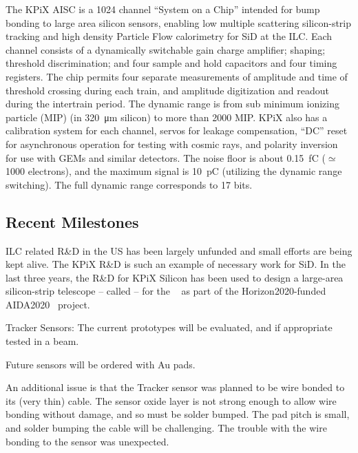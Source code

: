 The KPiX AISC is a 1024 channel ``System on a Chip'' intended for bump bonding 
to large area silicon sensors, enabling low multiple scattering silicon-strip 
tracking and high density Particle Flow calorimetry for SiD at the ILC. 
Each channel consists of a dynamically switchable gain charge amplifier; 
shaping; threshold discrimination; and four sample and hold 
capacitors and four timing registers. The chip permits four  separate measurements of 
amplitude and time of threshold crossing during each train, and amplitude 
digitization and readout during the intertrain period. The dynamic range is from 
sub minimum ionizing particle (MIP) (in \SI{320}{\micro\meter} silicon) to more 
than 2000 MIP. KPiX also has a calibration system for each channel, servos for 
leakage compensation, ``DC'' reset for asynchronous operation for testing with 
cosmic rays, and polarity inversion for use with GEMs and similar detectors. The 
noise floor is about \SI{0.15}{fC} ($\simeq$ 1000 electrons), and the maximum 
signal is \SI{10}{pC} (utilizing the dynamic range switching). The full dynamic 
range corresponds to 17 bits.


\subsection{Recent Milestones}
ILC related R\&D in the US has been largely unfunded and small efforts are being kept alive. The KPiX R\&D is such an example of necessary work for SiD.
In the last three years, the R\&D for KPiX Silicon has been used to design a large-area silicon-strip telescope -- called \LYCORIS -- for the \DIITBF~\cite{desytb2018}
as part of the Horizon2020-funded AIDA2020~\cite{aida2020} project.


Tracker Sensors: The current prototypes will be evaluated, and if appropriate tested in a beam.

Future sensors will be ordered with Au pads.

An additional issue is that the Tracker sensor was planned to be wire bonded to its (very thin) cable. The sensor oxide layer is not strong enough to allow wire bonding without damage, and so must be solder bumped. The pad pitch is small, and solder bumping the cable will be challenging. The trouble with the wire bonding to the sensor was unexpected.

